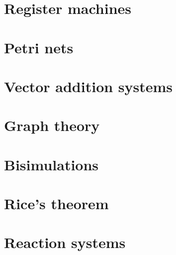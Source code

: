 
\section{Register machines} %
\label{sec:register_machines}



\section{Petri nets} %
\label{sec:petri_nets}



\section{Vector addition systems} %
\label{sec:vector_addition_systems}



\section{Graph theory} %
\label{sec:graph_theory}



\section{Bisimulations} %
\label{sec:bisimulations}


\section{Rice's theorem} %
\label{sec:rice_s_theorem}


\section{Reaction systems} %
\label{sec:reaction_systems}

